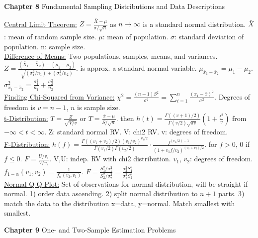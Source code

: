 \documentclass[9pt]{article}
\begin{document}
    \noindent\textbf{Chapter 8} Fundamental Sampling Distributions and Data Descriptions
    \begin{multicols}{2}
        \noindent\uline{Central Limit Theorem:} $Z=\frac{\bar{X}-\mu}{\sigma/\sqrt{n}}$ as $n\rightarrow\infty$ is a standard normal distribution.
        $\bar{X}$: mean of random sample size. $\mu$: mean of population. $\sigma$: standard deviation of population.
        n: sample size.\\
        \uline{Difference of Means:} Two populations, samples, means, and variances. $Z=\frac{(\bar{X}_1-\bar{X}_2)-(\mu_1-\mu_2)}{\sqrt{(\sigma^2_1/n_1)+ (\sigma^2_2/n_2)}}$.
        is approx. a standard normal variable.
        $\mu_{\bar{x}_{1}-\bar{x}_{2}}=\mu_1-\mu_2$. $\sigma_{\bar{x}_{1}-\bar{x}_{2}}^{2}=\frac{\sigma_1^2}{n_1}+\frac{\sigma_2^2}{n_2}$\\
        \uline{Finding Chi-Squared from Variance:} $\chi^2=\frac{(n-1)S^2}{\sigma^2}=\sum_{i=1}^{n}\frac{(x_1-\bar{x})^2}{\sigma^2}$. Degrees of
        freedom is $v=n-1$, $n$ is sample size.\\
        \uline{t-Distribution:} $T=\frac{Z}{\sqrt{V/v}}$ or $T=\frac{\bar{x}-\mu}{S/\sqrt{n}}$.
        then $h(t)=\frac{\Gamma((v+1)/2)}{\Gamma(v/2)\sqrt{\pi v}}(1+\frac{t^2}{v})$ from $-\infty<t<\infty$.
        Z: standard normal RV. V: chi2 RV. v: degrees of freedom.\\
        \uline{F-Distribution:} $h(f)=\frac{\Gamma((v_1+v_2)/2)(v_1/v_2)^{v_1/2}}{\Gamma(v_1/2)\Gamma(v_2/2)}\cdot
        \frac{f^{(v_1/2)-1}}{(1+v_1f/v_2)^{(v_1+v_2)/2}}$. for $f>0$, 0 if $f\leq 0$. $F=\frac{U/v_1}{V/v_2}$. V,U: indep. RV with chi2 distribution.
        $v_1$, $v_2$: degrees of freedom. $f_{1-\alpha}(v_1,v_2)=\frac{1}{f_{\alpha}(v_2,v_1)}$. $F=\frac{S_1^2/\sigma_1^2}{S_2^2/\sigma_2^2}=\frac{\sigma_2^2S_1^2}{\sigma_1^2S_2^2}$\\
        \uline{Normal Q-Q Plot:} Set of observations for normal distribution, will be straight if normal. 1) order data ascending. 2) split normal distribution
        to $n+1$ parts. 3) match the data to the distribution x=data, y=normal. Match smallest with smallest.
    \end{multicols}
    \noindent\textbf{Chapter 9} One- and Two-Sample Estimation Problems
\end{document}
